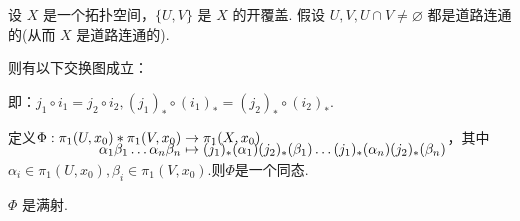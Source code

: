 设 $X$ 是一个拓扑空间，$\{U, V\}$ 是 $X$ 的开覆盖.
假设 $U, V, U \cap V \neq \varnothing$ 都是道路连通的(从而 $X$ 是道路连通的). \par
则有以下交换图成立： \par
{}
\par
即：$j_1\circ i_1=j_2\circ i_2,(j_1)_* \circ (i_1)_* = (j_2)_* \circ (i_2)_*$.

定义$\setjot[-4]\begin{aligned}[t]
    \Phi: \pi_1(U, x_0) * \pi_1(V, x_0) &\to \pi_1(X, x_0) \\
    \alpha_1 \beta_1 \dots \alpha_n \beta_n &\mapsto (j_1)_*(\alpha_1) (j_2)_*(\beta_1) \dots (j_1)_*(\alpha_n) (j_2)_*(\beta_n)
\end{aligned}$，其中 $\alpha_i \in \pi_1(U, x_0), \beta_i \in \pi_1(V, x_0)$.则$\Phi$是一个同态.

\begin{lemma}[][lem:10.15]
    $\Phi$ 是满射.
\end{lemma}

